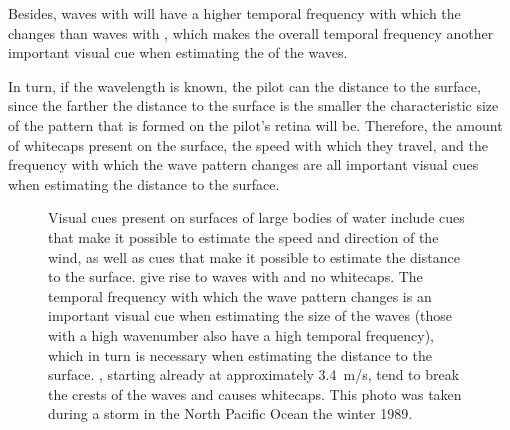 Besides, waves with  will have a higher temporal frequency with which the  changes than waves with , which makes the overall temporal frequency another important visual cue when estimating the  of the waves.

In turn, if the wavelength is known, the pilot can \estimate the distance to the surface, since the farther the distance to the surface is the smaller the characteristic size of the pattern that is formed on the pilot's retina will be. Therefore, the amount of whitecaps present on the surface, the speed with which they travel, and the frequency with which the wave pattern changes are all important visual cues when estimating the distance to the surface.

\begin{figure}
    \centering
    \caption{Visual cues present on surfaces of large bodies of water include cues that make it possible to estimate the speed and direction of the wind, as well as cues that make it possible to estimate the distance to the surface.   give rise to waves with  and no whitecaps. The temporal frequency with which the wave pattern changes is an important visual cue when estimating the size of the waves (those with a high wavenumber also have a high temporal frequency), which in turn is necessary when estimating the distance to the surface.  , starting already at approximately 3.4~m/s, tend to break the crests of the waves and causes whitecaps. This photo was taken during a storm in the North Pacific Ocean the winter 1989.}
    \label{fig:sea_states}
\end{figure}

